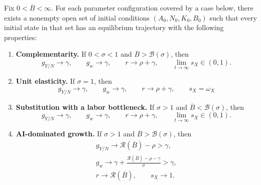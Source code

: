 \begin{proposition}
\label{prop:rewrite-equilibrium-regimes}
Fix $0<\overline B<\infty$.
For each parameter configuration covered by
a case below, there exists a nonempty open set of initial conditions
$(A_0,N_0,K_0,B_0)$ such that every initial state in that set has an
equilibrium trajectory with the following properties:
\begin{enumerate}[label=(\roman*),ref=\theproposition(\roman*),leftmargin=*,itemsep=0.5em]
 \item \textnormal{\textbf{Complementarity.}}
 \label{prop:rewrite-capped-complements-existence}
 If $0<\sigma<1$ and $\overline B>\mathcal B(\sigma)$, then
 \begin{equation}
  g_{Y/N}\to\gamma,\qquad g_w\to\gamma,\qquad
  r\to\rho+\gamma,\qquad \lim_{t\to\infty}s_X\in(0,1).
  \label{eq:rewrite-complements-terminal}
 \end{equation}

 \item \textnormal{\textbf{Unit elasticity.}}
 \label{prop:rewrite-capped-unit-existence}
 If $\sigma=1$, then
 \begin{equation}
  g_{Y/N}\to\gamma,\qquad g_w\to\gamma,\qquad r\to\rho+\gamma,\qquad s_X=\omega_X
  \label{eq:rewrite-unit-terminal}
 \end{equation}

 \item \textnormal{\textbf{Substitution with a labor bottleneck.}}
 \label{prop:rewrite-capped-substitutes-labor-existence}
 If $\sigma>1$ and $\overline B<\mathcal B(\sigma)$, then
 \begin{equation}
  g_{Y/N}\to\gamma,\qquad g_w\to\gamma,\qquad
  r\to\rho+\gamma,\qquad \lim_{t\to\infty}s_X\in(0,1).
  \label{eq:rewrite-substitutes-labor-terminal}
 \end{equation}

 \item \textnormal{\textbf{AI-dominated growth.}}
 \label{prop:rewrite-capped-substitutes-existence}
 If $\sigma>1$ and $\overline B>\mathcal B(\sigma)$, then
 \begin{gather}
  g_{Y/N}\to\mathcal R(\overline B)-\rho>\gamma,
  \label{eq:rewrite-substitutes-ai-limits}\\
  g_w\to\gamma+
  \frac{\mathcal R(\overline B)-\rho-\gamma}{\sigma}>\gamma,
  \label{eq:rewrite-substitutes-wage-growth}\\
  r\to\mathcal R(\overline B),\qquad s_X\to1. \nonumber
 \end{gather}
\end{enumerate}
\end{proposition}

